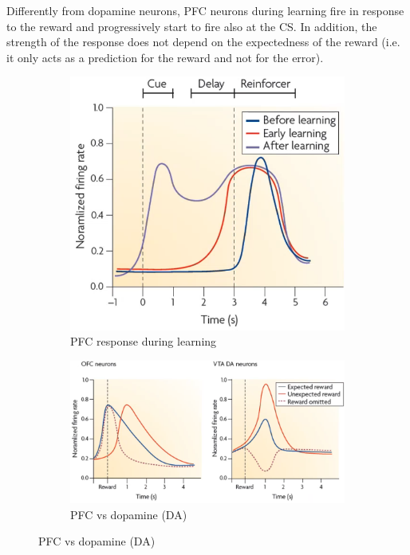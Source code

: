 \begin{remark}
    Differently from dopamine neurons, PFC neurons during learning fire in response to the reward and progressively start to fire also at the CS.
    In addition, the strength of the response does not depend on the expectedness of the reward 
    (i.e. it only acts as a prediction for the reward and not for the error).

    \begin{figure}[H]
        \centering
        \begin{subfigure}{0.34\linewidth}
            \centering
            \includegraphics[width=0.9\linewidth]{./img/pfc_learning.png}
            \caption{PFC response during learning}
        \end{subfigure}
        \begin{subfigure}{0.62\linewidth}
            \centering
            \includegraphics[width=0.9\linewidth]{./img/pfc_vs_dopamine.png}
            \caption{PFC vs dopamine (DA)}
        \end{subfigure}
    \end{figure}
\end{remark}



